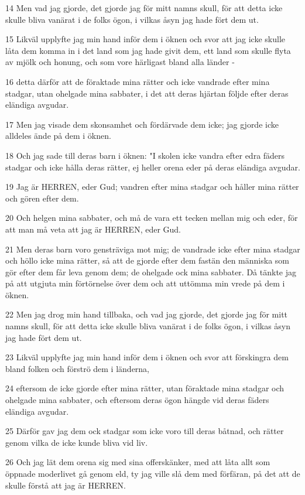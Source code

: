 \par 14 Men vad jag gjorde, det gjorde jag för mitt namns skull, för att detta icke skulle bliva vanärat i de folks ögon, i vilkas åsyn jag hade fört dem ut.
\par 15 Likväl upplyfte jag min hand inför dem i öknen och svor att jag icke skulle låta dem komma in i det land som jag hade givit dem, ett land som skulle flyta av mjölk och honung, och som vore härligast bland alla länder -
\par 16 detta därför att de föraktade mina rätter och icke vandrade efter mina stadgar, utan ohelgade mina sabbater, i det att deras hjärtan följde efter deras eländiga avgudar.
\par 17 Men jag visade dem skonsamhet och fördärvade dem icke; jag gjorde icke alldeles ände på dem i öknen.
\par 18 Och jag sade till deras barn i öknen: "I skolen icke vandra efter edra fäders stadgar och icke hålla deras rätter, ej heller orena eder på deras eländiga avgudar.
\par 19 Jag är HERREN, eder Gud; vandren efter mina stadgar och håller mina rätter och gören efter dem.
\par 20 Och helgen mina sabbater, och må de vara ett tecken mellan mig och eder, för att man må veta att jag är HERREN, eder Gud.
\par 21 Men deras barn voro gensträviga mot mig; de vandrade icke efter mina stadgar och höllo icke mina rätter, så att de gjorde efter dem fastän den människa som gör efter dem får leva genom dem; de ohelgade ock mina sabbater. Då tänkte jag på att utgjuta min förtörnelse över dem och att uttömma min vrede på dem i öknen.
\par 22 Men jag drog min hand tillbaka, och vad jag gjorde, det gjorde jag för mitt namns skull, för att detta icke skulle bliva vanärat i de folks ögon, i vilkas åsyn jag hade fört dem ut.
\par 23 Likväl upplyfte jag min hand inför dem i öknen och svor att förskingra dem bland folken och förströ dem i länderna,
\par 24 eftersom de icke gjorde efter mina rätter, utan föraktade mina stadgar och ohelgade mina sabbater, och eftersom deras ögon hängde vid deras fäders eländiga avgudar.
\par 25 Därför gav jag dem ock stadgar som icke voro till deras båtnad, och rätter genom vilka de icke kunde bliva vid liv.
\par 26 Och jag lät dem orena sig med sina offerskänker, med att låta allt som öppnade moderlivet gå genom eld, ty jag ville slå dem med förfäran, på det att de skulle förstå att jag är HERREN.
